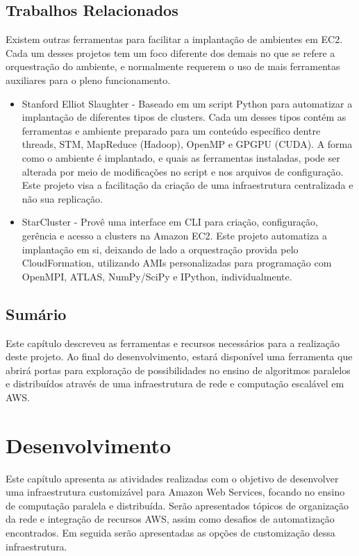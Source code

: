 \documentclass[tg]{mdtufsm}
\begin{document}
\section{Trabalhos Relacionados}

Existem outras ferramentas para facilitar a implantação de ambientes em EC2. Cada um desses projetos tem um foco diferente dos demais no que se refere a orquestração do ambiente, e normalmente requerem o uso de mais ferramentas auxiliares para o pleno funcionamento.

\begin{itemize}
	\item Stanford Elliot Slaughter - Baseado em um script Python para automatizar a implantação de diferentes tipos de clusters. Cada um desses tipos contém as ferramentas e ambiente preparado para um conteúdo específico dentre threads, STM, MapReduce (Hadoop), OpenMP e GPGPU (CUDA). A forma como o ambiente é implantado, e quais as ferramentas instaladas, pode ser alterada por meio de modificações no script e nos arquivos de configuração. Este projeto visa a facilitação da criação de uma infraestrutura centralizada e não sua replicação.
	
	\item StarCluster \cite{starcluster} - Provê uma interface em CLI para criação, configuração, gerência e acesso a clusters na Amazon EC2. Este projeto automatiza a implantação em si, deixando de lado a orquestração provida pelo CloudFormation, utilizando AMIs personalizadas para programação com OpenMPI, ATLAS, NumPy/SciPy e IPython, individualmente.
\end{itemize}

\section{Sumário}

Este capítulo descreveu as ferramentas e recursos necessários para a realização deste projeto. Ao final do desenvolvimento, estará disponível uma ferramenta que abrirá portas para exploração de possibilidades no ensino de algoritmos paralelos e distribuídos através de uma infraestrutura de rede e computação escalável em AWS.

\chapter{Desenvolvimento}

Este capítulo apresenta as atividades realizadas com o objetivo de desenvolver uma infraestrutura customizável para Amazon Web Services, focando no ensino de computação paralela e distribuída. Serão apresentados tópicos de organização da rede e integração de recursos AWS, assim como desafios de automatização encontrados. Em seguida serão apresentadas as opções de customização dessa infraestrutura.
\end{document}
